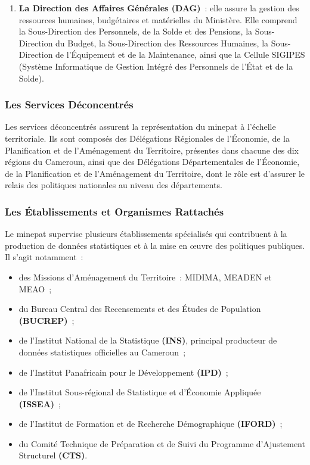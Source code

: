 \documentclass[12pt, a4paper, oneside]{report}
\begin{document}
\begin{enumerate}
	\item \textbf{La Direction des Affaires Générales (DAG)}~: elle assure la gestion
	des ressources humaines, budgétaires et matérielles du Ministère. Elle comprend la
	Sous-Direction des Personnels, de la Solde et des Pensions, la Sous-Direction du
	Budget, la Sous-Direction des Ressources Humaines, la Sous-Direction de
	l'Équipement et de la Maintenance, ainsi que la Cellule SIGIPES (Système
	Informatique de Gestion Intégré des Personnels de l'État et de la Solde).
	
\end{enumerate}

\subsubsection{Les Services Déconcentrés}

Les services déconcentrés assurent la représentation du \gls{minepat} à l'échelle
territoriale. Ils sont composés des Délégations Régionales de l'Économie, de la
Planification et de l'Aménagement du Territoire, présentes dans chacune des dix
régions du Cameroun, ainsi que des Délégations Départementales de l'Économie, de
la Planification et de l'Aménagement du Territoire, dont le rôle est d'assurer le
relais des politiques nationales au niveau des départements.

\subsubsection{Les Établissements et Organismes Rattachés}

Le \gls{minepat} supervise plusieurs établissements spécialisés qui contribuent à la
production de données statistiques et à la mise en \oe uvre des politiques publiques.
Il s'agit notamment~:

\begin{itemize}
	\item des Missions d'Aménagement du Territoire~: MIDIMA, MEADEN et MEAO~;
	\item du Bureau Central des Recensements et des Études de Population
	\textbf{(BUCREP)}~;
	\item de l'Institut National de la Statistique \textbf{(INS)}, principal producteur
	de données statistiques officielles au Cameroun~;
	\item de l'Institut Panafricain pour le Développement \textbf{(IPD)}~;
	\item de l'Institut Sous-régional de Statistique et d'Économie Appliquée
	\textbf{(ISSEA)}~;
	\item de l'Institut de Formation et de Recherche Démographique \textbf{(IFORD)}~;
	\item du Comité Technique de Préparation et de Suivi du Programme d'Ajustement
	Structurel \textbf{(CTS)}.
\end{itemize}
\end{document}
